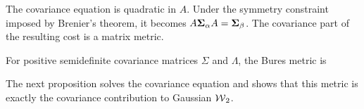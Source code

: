 The covariance equation is quadratic in $A$. Under the symmetry constraint imposed by Brenier's theorem, it becomes $A\mathbf{\Sigma}_\alpha A=\mathbf{\Sigma}_\beta$. The covariance part of the resulting cost is a matrix metric.

\begin{defn}\label{def-bures-metric}
	For positive semidefinite covariance matrices $\Sigma$ and $\Lambda$, the Bures metric is
\end{defn}
The next proposition solves the covariance equation and shows that this metric is exactly the covariance contribution to Gaussian $\operatorname{\mathcal{W}}_2$.


